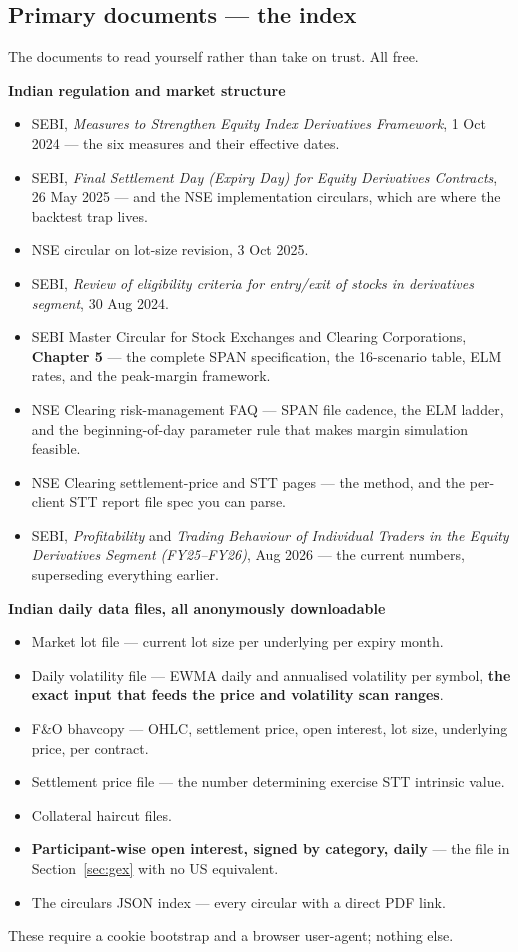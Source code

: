 \documentclass[11pt,a4paper]{article}
\newcommand{\srcnote}[1]{{\footnotesize\color{soft}#1\par}}
\begin{document}
\subsection{Primary documents --- the index}
\label{app:primary}

The documents to read yourself rather than take on trust. All free.

\textbf{Indian regulation and market structure}
\begin{itemize}\footnotesize
\item SEBI, \emph{Measures to Strengthen Equity Index Derivatives Framework}, 1 Oct 2024 --- the six measures and their effective dates.
\item SEBI, \emph{Final Settlement Day (Expiry Day) for Equity Derivatives Contracts}, 26 May 2025 --- and the NSE implementation circulars, which are where the backtest trap lives.
\item NSE circular on lot-size revision, 3 Oct 2025.
\item SEBI, \emph{Review of eligibility criteria for entry/exit of stocks in derivatives segment}, 30 Aug 2024.
\item SEBI Master Circular for Stock Exchanges and Clearing Corporations, \textbf{Chapter 5} --- the complete SPAN specification, the 16-scenario table, ELM rates, and the peak-margin framework.
\item NSE Clearing risk-management FAQ --- SPAN file cadence, the ELM ladder, and the beginning-of-day parameter rule that makes margin simulation feasible.
\item NSE Clearing settlement-price and STT pages --- the method, and the per-client STT report file spec you can parse.
\item SEBI, \emph{Profitability} and \emph{Trading Behaviour of Individual Traders in the Equity Derivatives Segment (FY25--FY26)}, Aug 2026 --- the current numbers, superseding everything earlier.
\end{itemize}

\textbf{Indian daily data files, all anonymously downloadable}
\begin{itemize}\footnotesize
\item Market lot file --- current lot size per underlying per expiry month.
\item Daily volatility file --- EWMA daily and annualised volatility per symbol, \textbf{the exact input that feeds the price and volatility scan ranges}.
\item F\&O bhavcopy --- OHLC, settlement price, open interest, lot size, underlying price, per contract.
\item Settlement price file --- the number determining exercise STT intrinsic value.
\item Collateral haircut files.
\item \textbf{Participant-wise open interest, signed by category, daily} --- the file in Section~\ref{sec:gex} with no US equivalent.
\item The circulars JSON index --- every circular with a direct PDF link.
\end{itemize}
\srcnote{These require a cookie bootstrap and a browser user-agent; nothing else.}
\end{document}
